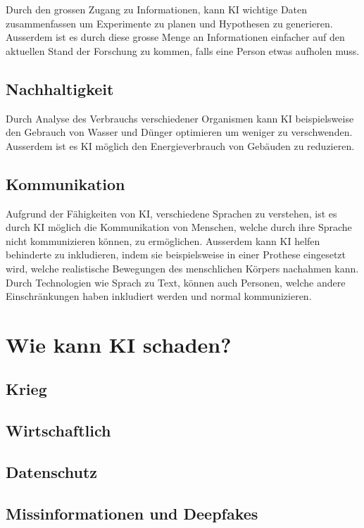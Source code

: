 \documentclass{report}
\begin{document}
Durch den grossen Zugang zu Informationen, kann KI wichtige Daten zusammenfassen um Experimente zu planen und Hypothesen zu generieren. Ausserdem ist es durch diese grosse Menge an Informationen einfacher auf den aktuellen Stand der Forschung zu kommen, falls eine Person etwas aufholen muss. 

\subsection{Nachhaltigkeit}

Durch Analyse des Verbrauchs verschiedener Organismen kann KI beispielsweise den Gebrauch von Wasser und Dünger optimieren um weniger zu verschwenden. Ausserdem ist es KI möglich den Energieverbrauch von Gebäuden zu reduzieren.

\subsection{Kommunikation}

Aufgrund der Fähigkeiten von KI, verschiedene Sprachen zu verstehen, ist es durch KI möglich die Kommunikation von Menschen, welche durch ihre Sprache nicht kommunizieren können, zu ermöglichen. Ausserdem kann KI helfen behinderte zu inkludieren, indem sie beispielsweise in einer Prothese eingesetzt wird, welche realistische Bewegungen des menschlichen Körpers nachahmen kann. Durch Technologien wie Sprach zu Text, können auch Personen, welche andere Einschränkungen haben inkludiert werden und normal kommunizieren.

\section{Wie kann KI schaden?}

\subsection{Krieg}

\subsection{Wirtschaftlich}

\subsection{Datenschutz}

\subsection{Missinformationen und Deepfakes}

\printbibliography
\end{document}
